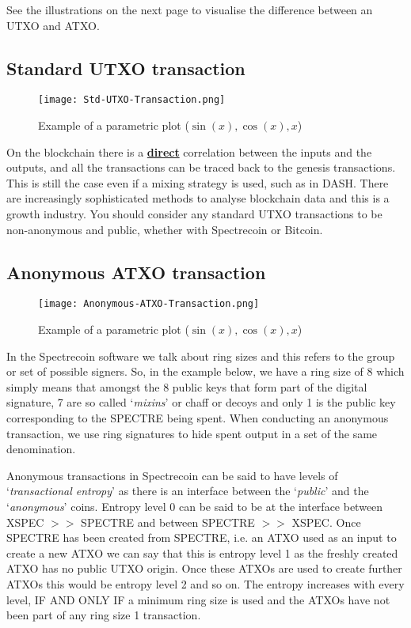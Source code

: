 See the illustrations on the next page to visualise the difference between an
UTXO and ATXO.



\subsection{Standard UTXO transaction}

\begin{figure}[h]
	\caption{Example of a parametric plot ($\sin (x), \cos(x), x$)}
	\centering
	\texttt{[image: Std-UTXO-Transaction.png]}
\end{figure}

On the blockchain there is a \textbf{\underline{direct}} correlation
between the inputs and the
outputs, and all the transactions can be traced back to the genesis
transactions. This is still the case even if a mixing strategy is used,
such as in DASH. There are increasingly sophisticated methods to analyse
blockchain data and this is a growth industry. You should consider any
standard UTXO transactions to be non-anonymous and public, whether with
Spectrecoin or Bitcoin.



\subsection{Anonymous ATXO transaction}



\begin{figure}[h]
	\caption{Example of a parametric plot ($\sin (x), \cos(x), x$)}
	\centering
	\texttt{[image: Anonymous-ATXO-Transaction.png]}
\end{figure}



In the Spectrecoin software we talk about ring sizes and this refers to the
group or set of possible signers. So, in the example below, we have a ring
size of 8 which simply means that amongst the 8 public keys that form part
of the digital signature, 7 are so called ‘\textit{mixins}’ or chaff or decoys and
only 1 is the public key corresponding to the SPECTRE being spent. When
conducting an anonymous transaction, we use ring signatures to hide spent
output in a set of the same denomination.



Anonymous transactions in Spectrecoin can be said to have levels of
‘\textit{transactional entropy}’ as there is an interface between the ‘\textit{public}’
and the ‘\textit{anonymous}’ coins. Entropy level 0 can be said to be at the
interface between XSPEC $>>$ SPECTRE and between SPECTRE $>>$ XSPEC. Once
SPECTRE has been created from SPECTRE, i.e. an ATXO used as an input to
create a new ATXO we can say that this is entropy level 1 as the freshly
created ATXO has no public UTXO origin. Once these ATXOs are used to
create further ATXOs this would be entropy level 2 and so on. The entropy
increases with every level, IF AND ONLY IF a minimum ring size is used and
the ATXOs have not been part of any ring size 1 transaction.




